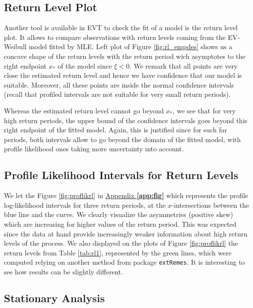 \subsection*{Return Level Plot}

Another tool is available in EVT to check the fit of a model is the return level plot. It allows to compare
observations with return levels coming from the EV-Weibull model fitted by MLE. Left plot of
Figure \ref{fig:rl_empdes} shows us a concave shape of the return levels with the return period wich asymptotes to the right endpoint $x_*$ of the model since $\xi<0$. We remark
that all points are very close the estimated return level and hence we have confidence that our model
is suitable. Moreover, all these points are inside the normal confidence intervals (recall that profiled intervals are not suitable for very small return periods).

Whereas the estimated return level cannot go beyond $x_*$, we see that for very high return periods, the upper bound of the confidence intervals goes beyond this right endpoint of the fitted model. Again, this is justified since for such far periods, both intervals allow to go beyond the domain of the fitted model, with profile likelihood ones taking more uncertainty into account.



\subsection*{Profile Likelihood Intervals for Return Levels}

We let the Figure \ref{fig:proflikrl} in \hyperref[app:fig]{Appendix \textbf{\ref{app:fig}}} which represents the profile log-likelihood intervals for three return periods, at the $x$-intersections between the blue line and the curve. We
clearly visualize the asymmetries (positive skew) which are increasing for higher
values of the return period. This was expected since the data at hand provide increasingly weaker information about high return levels of the process. We also displayed on the plots of Figure \ref{fig:proflikrl} the return levels
from Table \ref{tab:rl1}, represented by the green lines, which were computed relying on another method from
package \texttt{extRemes}. It is interesting to see how results can be slightly different.


\subsection{Stationary Analysis}


